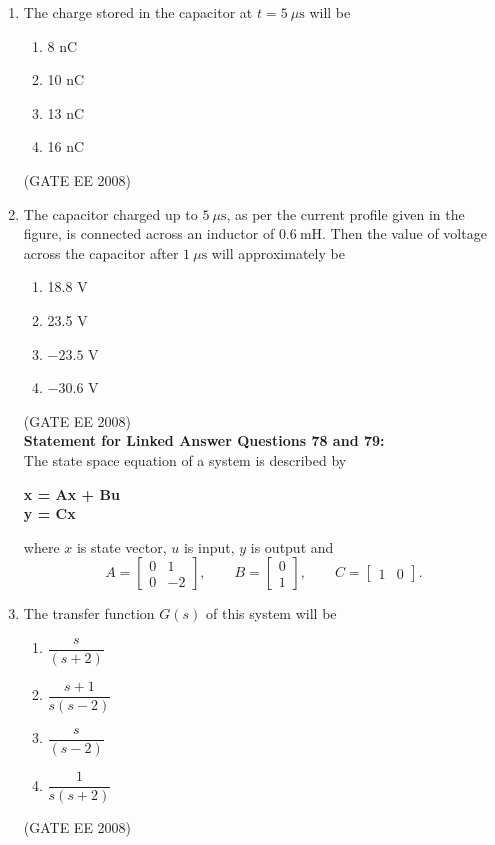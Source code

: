 \documentclass[journal,12pt,onecolumn]{IEEEtran}
\theoremstyle{remark}
\begin{document}
\begin{enumerate}[start=1, label=Q.\arabic*]
\item  The charge stored in the capacitor at $t = 5~\mu\text{s}$ will be
\begin{multicols}{4}
\begin{enumerate}
    \item 8 nC
    \item 10 nC
    \item 13 nC
    \item 16 nC
\end{enumerate}
\end{multicols}
\hfill (GATE EE 2008) \\[5mm]

\item The capacitor charged up to $5~\mu\text{s}$, as per the current profile given in the figure, is connected across an inductor of $0.6~\text{mH}$. Then the value of voltage across the capacitor after $1~\mu\text{s}$ will approximately be
\begin{multicols}{4}
\begin{enumerate}
    \item 18.8 V
    \item 23.5 V
    \item $-23.5$ V
    \item $-30.6$ V
\end{enumerate}
\end{multicols}
\hfill (GATE EE 2008) \\[5mm]

\textbf{Statement for Linked Answer Questions 78 and 79:}\\

The state space equation of a system is described by
\begin{center}
\textbf{x = Ax + Bu}\\
\textbf{y = Cx}\\
\end{center}
where $x$ is state vector, $u$ is input, $y$ is output and
\[
A=\begin{bmatrix}0&1\\[2pt]0&-2\end{bmatrix},\qquad
B=\begin{bmatrix}0\\[2pt]1\end{bmatrix},\qquad
C=\begin{bmatrix}1&0\end{bmatrix}.
\]

\item The transfer function $G(s)$ of this system will be
\begin{multicols}{4}
\begin{enumerate}
    \item $\dfrac{s}{(s+2)}$
    \item $\dfrac{s+1}{s(s-2)}$
    \item $\dfrac{s}{(s-2)}$
    \item $\dfrac{1}{s(s+2)}$
\end{enumerate}
\end{multicols}
\hfill (GATE EE 2008) \\[5mm]



\end{enumerate}
\end{document}
